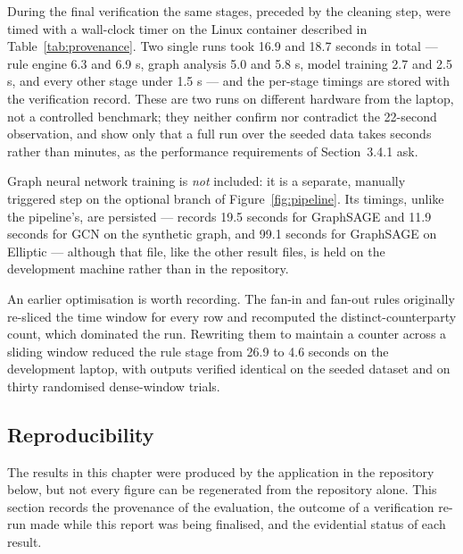 During the final verification the same stages, preceded by the cleaning step, were timed with a wall-clock timer on the Linux container described in Table~\ref{tab:provenance}. Two single runs took 16.9 and 18.7 seconds in total --- rule engine 6.3 and 6.9 s, graph analysis 5.0 and 5.8 s, model training 2.7 and 2.5 s, and every other stage under 1.5 s --- and the per-stage timings are stored with the verification record. These are two runs on different hardware from the laptop, not a controlled benchmark; they neither confirm nor contradict the 22-second observation, and show only that a full run over the seeded data takes seconds rather than minutes, as the performance requirements of Section~3.4.1 ask.

Graph neural network training is \textit{not} included: it is a separate, manually triggered step on the optional branch of Figure~\ref{fig:pipeline}. Its timings, unlike the pipeline's, are persisted ---  records 19.5 seconds for GraphSAGE and 11.9 seconds for GCN on the synthetic graph, and 99.1 seconds for GraphSAGE on Elliptic --- although that file, like the other result files, is held on the development machine rather than in the repository.

An earlier optimisation is worth recording. The fan-in and fan-out rules originally re-sliced the time window for every row and recomputed the distinct-counterparty count, which dominated the run. Rewriting them to maintain a counter across a sliding window reduced the rule stage from 26.9 to 4.6 seconds on the development laptop, with outputs verified identical on the seeded dataset and on thirty randomised dense-window trials.

\subsection{Reproducibility}\label{sec:repro}
The results in this chapter were produced by the application in the repository below, but not every figure can be regenerated from the repository alone. This section records the provenance of the evaluation, the outcome of a verification re-run made while this report was being finalised, and the evidential status of each result.

